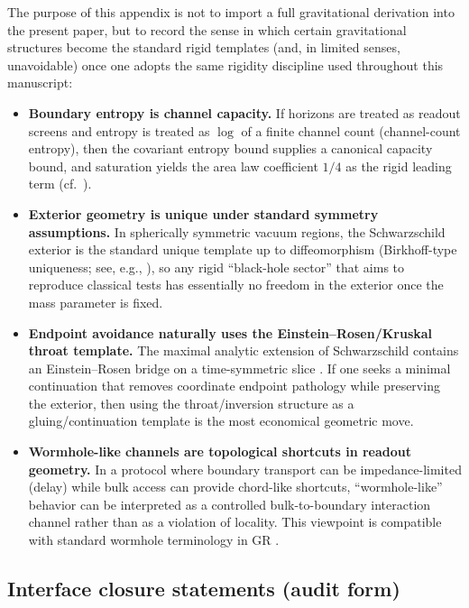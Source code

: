 The purpose of this appendix is not to import a full gravitational derivation into the present paper, but to record the sense in which certain gravitational structures become the standard rigid templates (and, in limited senses, unavoidable) once one adopts the same rigidity discipline used throughout this manuscript:
\begin{itemize}
\item \textbf{Boundary entropy is channel capacity.}
If horizons are treated as readout screens and entropy is treated as $\log$ of a finite channel count (channel-count entropy), then the covariant entropy bound supplies a canonical capacity bound, and saturation yields the area law coefficient $1/4$ as the rigid leading term (cf.\ \cite{Bousso2002}).
\item \textbf{Exterior geometry is unique under standard symmetry assumptions.}
In spherically symmetric vacuum regions, the Schwarzschild exterior is the standard unique template up to diffeomorphism (Birkhoff-type uniqueness; see, e.g., \cite{Birkhoff1923,Wald1984}), so any rigid ``black-hole sector'' that aims to reproduce classical tests has essentially no freedom in the exterior once the mass parameter is fixed.
\item \textbf{Endpoint avoidance naturally uses the Einstein--Rosen/Kruskal throat template.}
The maximal analytic extension of Schwarzschild contains an Einstein--Rosen bridge on a time-symmetric slice \cite{EinsteinRosen1935,Kruskal1960,Wald1984}.
If one seeks a minimal continuation that removes coordinate endpoint pathology while preserving the exterior, then using the throat/inversion structure as a gluing/continuation template is the most economical geometric move.
\item \textbf{Wormhole-like channels are topological shortcuts in readout geometry.}
In a protocol where boundary transport can be impedance-limited (delay) while bulk access can provide chord-like shortcuts, ``wormhole-like'' behavior can be interpreted as a controlled bulk-to-boundary interaction channel rather than as a violation of locality.
This viewpoint is compatible with standard wormhole terminology in GR \cite{MorrisThorne1988,Visser1995}.
\end{itemize}

\subsection{Interface closure statements (audit form)}
\label{app:bh_wormholes_interface_closure}

